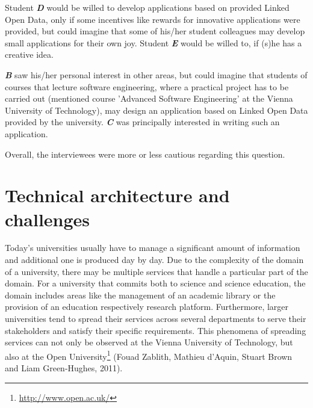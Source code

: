 \documentclass{article}
\begin{document}
Student \textit{\textbf{D}} would be willed to develop applications based on provided Linked Open Data, only if some incentives like rewards for innovative applications were provided, but could imagine that some of his/her student colleagues may develop small applications for their own joy. Student \textit{\textbf{E}} would be willed to, if (s)he has a creative idea. 

\textit{\textbf{B}} saw his/her personal interest in other areas, but could imagine that students of courses that lecture software engineering, where a practical project has to be carried out (mentioned course 'Advanced Software Engineering' at the Vienna University of Technology), may design an application based on Linked Open Data provided by the university. \textit{\textbf{C}} was principally interested in writing such an application.

Overall, the interviewees were more or less cautious regarding this question.


\section{Technical architecture and challenges}
\label{technical-architecture-challenges}

Today's universities usually have to manage a significant amount of information and additional one is produced day by day. Due to the complexity of the domain of a university, there may be multiple services that handle a particular part of the domain. For a university that commits both to science and science education, the domain includes areas like the management of an academic library or the provision of an education respectively research platform. Furthermore, larger universities tend to spread their services across several departments to serve their stakeholders and satisfy their specific requirements. This phenomena of spreading services can not only be observed at the Vienna University of Technology, but also at the Open University\footnote{\url{http://www.open.ac.uk/}} (Fouad Zablith, Mathieu d’Aquin, Stuart Brown and Liam Green-Hughes, 2011)\cite{zablith_consuming_2011}.
\end{document}
